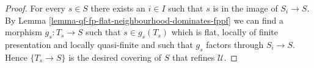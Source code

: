 \documentclass[10pt,a4paper]{amsart}
\theoremstyle{plain}
\theoremstyle{definition}
\theoremstyle{remark}
\numberwithin{equation}{subsection}
\begin{document}
\begin{proof}
For every $s \in S$ there exists an $i \in I$ such that $s$ is in
the image of $S_i \to S$. By
Lemma \ref{lemma-qf-fp-flat-neighbourhood-dominates-fppf}
we can find a morphism $g_s : T_s \to S$ such that $s \in g_s(T_s)$
which is flat, locally of finite presentation and locally quasi-finite
and such that $g_s$ factors through $S_i \to S$. Hence
$\{T_s \to S\}$ is the desired covering of $S$ that refines $\mathcal{U}$.
\end{proof}
\end{document}
